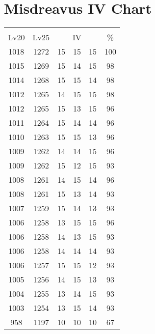 \documentclass{article}%
\begin{document}
%
\normalsize%
\section{Misdreavus IV Chart}%
\label{sec:Misdreavus IV Chart}%
\renewcommand{\arraystretch}{1.5}%
\begin{tabular}{|c|c|c|c|c|c|}%
\hline%
\multicolumn{6}{|c|}{\textcolor{white}{ 
\linebreak{Misdreavus}
}%
\cellcolor{black}}\\%
\multicolumn{1}{|c}{Lv20}&\multicolumn{1}{c|}{Lv25}&\multicolumn{3}{c|}{IV}&\multicolumn{1}{|c|}{\%}\\%
\hline%
\rowcolor{color100}%
1018&1272&15&15&15&100\\%
\hline%
\rowcolor{color98}%
1015&1269&15&14&15&98\\%
\hline%
\rowcolor{color98}%
1014&1268&15&15&14&98\\%
\hline%
\rowcolor{color98}%
1012&1265&14&15&15&98\\%
\hline%
\rowcolor{color96}%
1012&1265&15&13&15&96\\%
\hline%
\rowcolor{color96}%
1011&1264&15&14&14&96\\%
\hline%
\rowcolor{color96}%
1010&1263&15&15&13&96\\%
\hline%
\rowcolor{color96}%
1009&1262&14&14&15&96\\%
\hline%
\rowcolor{color93}%
1009&1262&15&12&15&93\\%
\hline%
\rowcolor{color96}%
1008&1261&14&15&14&96\\%
\hline%
\rowcolor{color93}%
1008&1261&15&13&14&93\\%
\hline%
\rowcolor{color93}%
1007&1259&15&14&13&93\\%
\hline%
\rowcolor{color96}%
1006&1258&13&15&15&96\\%
\hline%
\rowcolor{color93}%
1006&1258&14&13&15&93\\%
\hline%
\rowcolor{color93}%
1006&1258&14&14&14&93\\%
\hline%
\rowcolor{color93}%
1006&1257&15&15&12&93\\%
\hline%
\rowcolor{color93}%
1005&1256&14&15&13&93\\%
\hline%
\rowcolor{color93}%
1004&1255&13&14&15&93\\%
\hline%
\rowcolor{color93}%
1003&1254&13&15&14&93\\%
\hline%
\rowcolor{color91}%
958&1197&10&10&10&67\\%
\end{tabular}

%
\end{document}
